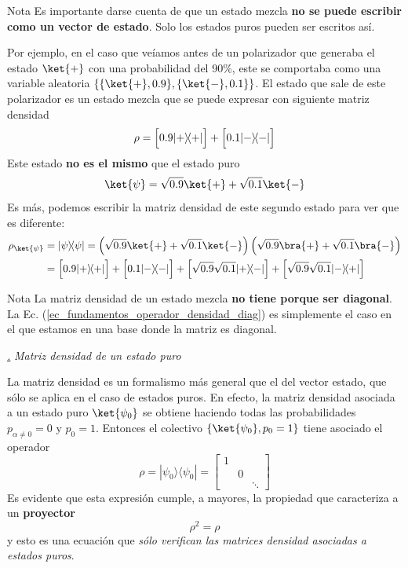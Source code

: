 \documentclass[a4paper,11pt]{book} %
\numberwithin{equation}{chapter}
\def\lp{\left(}
\def\rp{\right)}
\def\Lc{\Bigl[}
\def\Rc{\Bigr]}
\newcommand{\ketbra}[2]{| #1\rangle \! \langle #2|}
\def\subsubiContadorIt{\par\addtocounter{subsubsection}{1}\underline{\it\thesubsubsection.}\hskip0.5cm \setcounter{subsubsubsectionIt}{0}}
\newcommand{\SubsubiIt}[1]{
		\subsubiContadorIt \textit{#1}
	}
\newcounter{subsubsubsectionIt}[subsubsection]
\begin{document}
\begin{mybox_blue}{Nota}
Es importante darse cuenta de que un estado mezcla \textbf{no se puede escribir como un vector de estado}. Solo los estados puros pueden ser escritos así. 
\vspace{0.3cm}

Por ejemplo, en el caso que veíamos antes de un polarizador que generaba el estado $\ket{+}$ con una probabilidad del 90\%, este se comportaba como una variable aleatoria $ \{\{\ket{+},0.9\},\{\ket{-},0.1\}\}$. El estado que sale de este polarizador es un estado mezcla que se puede expresar con siguiente matriz densidad
	\begin{equation}
	\rho = \Lc 0.9 \ketbra{+}{+}\Rc + \Lc 0.1 \ketbra{-}{-} \Rc
	\end{equation}
Este estado \textbf{no es el mismo} que el estado puro
	\begin{equation}
	\ket{\psi} = \sqrt{0.9} \ket{+} + \sqrt{0.1} \ket{-}
	\end{equation}
Es más, podemos escribir la matriz densidad de este segundo estado para ver que es diferente:
	\begin{equation} 
\begin{aligned}
	\rho_{\ket{\psi}} 
	& =	\ketbra{\psi}{\psi} 
	  = \lp \sqrt{0.9} \ket{+} + \sqrt{0.1} \ket{-} \rp 
		\lp \sqrt{0.9} \bra{+} + \sqrt{0.1} \bra{-} \rp \\
	& = \Lc 0.9 \ketbra{+}{+} \Rc + \Lc 0.1 \ketbra{-}{-} \Rc + \Lc \sqrt{0.9}\sqrt{0.1} \ketbra{+}{-} \Rc  + \Lc \sqrt{0.9}\sqrt{0.1} \ketbra{-}{+} \Rc
	\end{aligned}
\end{equation}
\end{mybox_blue}


\begin{mybox_blue}{Nota}
La matriz densidad de un estado mezcla \textbf{no tiene porque ser diagonal}. La Ec. (\ref{ec_fundamentos_operador_densidad_diag}) es simplemente el caso en el que estamos en una base donde la matriz es diagonal.
\end{mybox_blue}

			\SubsubiIt{Matriz densidad de un estado puro}

La matriz densidad es un formalismo más general que el del vector estado, que sólo se aplica en el caso de estados puros. En efecto, la matriz densidad asociada a un estado puro $\ket{\psi_0}$ se obtiene haciendo todas las probabilidades $p_{\alpha\neq 0}=0$ y $p_{0} = 1$. Entonces el colectivo $\{\ket{\psi_0},p_0=1\}$ tiene asociado el operador
	\begin{equation}
	\rho = \ketbra{\psi_0}{\psi_0} = \begin{bmatrix}1 &  & \\ & 0 & \\ & & \ddots  \end{bmatrix}
	\end{equation}
Es evidente que esta expresión cumple, a mayores, la propiedad que caracteriza a un \textbf{proyector}
	\begin{equation}
	\rho^2 = \rho
	\end{equation}
y esto es una ecuación que \textit{sólo verifican las matrices densidad asociadas a estados puros}.
\end{document}
